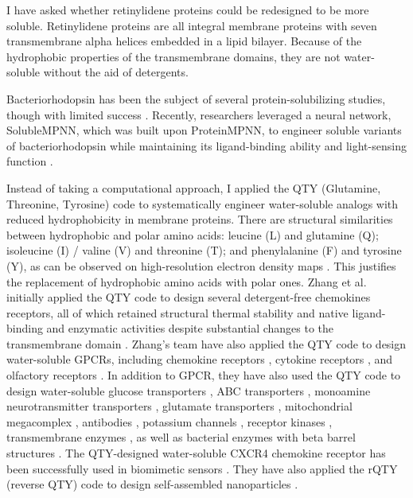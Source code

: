 \documentclass[fleqn, 10pt]{manuscript}
\begin{document}
I have asked whether retinylidene proteins could be redesigned to be more soluble. Retinylidene proteins are all integral membrane proteins with seven transmembrane alpha helices embedded in a lipid bilayer. Because of the hydrophobic properties of the transmembrane domains, they are not water-soluble without the aid of detergents. 

Bacteriorhodopsin has been the subject of several protein-solubilizing studies, though with limited success \citep{Qing_2022}. Recently, researchers leveraged a neural network, SolubleMPNN, which was built upon ProteinMPNN, to engineer soluble variants of bacteriorhodopsin while maintaining its ligand-binding ability and light-sensing function \citep{Nikolaev_2024}.

Instead of taking a computational approach, I applied the QTY (Glutamine, Threonine, Tyrosine) code to systematically engineer water-soluble analogs with reduced hydrophobicity in membrane proteins. There are structural similarities between hydrophobic and polar amino acids: leucine (L) and glutamine (Q); isoleucine (I) / valine (V) and threonine (T); and phenylalanine (F) and tyrosine (Y), as can be observed on high-resolution electron density maps \citep{Zhang_2018, Zhang_2022, Tegler_2020}. This justifies the replacement of hydrophobic amino acids with polar ones. Zhang et al. initially applied the QTY code to design several detergent-free chemokines receptors, all of which retained structural thermal stability and native ligand-binding and enzymatic activities despite substantial changes to the transmembrane domain \citep{Zhang_2018, Tegler_2020}. Zhang's team have also applied the QTY code to design water-soluble GPCRs, including chemokine receptors \citep{Zhang_2018, Qing_2019, Tegler_2020, Skuhersky_2021}, cytokine receptors \citep{Hao_2020}, and olfactory receptors \citep{Skuhersky_2021, Johnsson_2025}. In addition to GPCR, they have also used the QTY code to design water-soluble glucose transporters \citep{Smorodina_2022}, ABC transporters \citep{Pan_2024}, monoamine neurotransmitter transporters \citep{Karagol_Karagol_Alper_2024}, glutamate transporters \citep{Karagol_Karagol_Smorodina_2024, Karagol_2024}, mitochondrial megacomplex \citep{Chen_2025}, antibodies \citep{Li_Wang_2024}, potassium channels \citep{Smorodina_2024}, receptor kinases \citep{Li_Tang_2024}, transmembrane enzymes \citep{Chen_Pan_2025}, as well as bacterial enzymes with beta barrel structures \citep{Sajeev-Sheeja_2023, Sajeev-Sheeja_2024}. The QTY-designed water-soluble CXCR4 chemokine receptor has been successfully used in biomimetic sensors \citep{Qing_2023}. They have also applied the rQTY (reverse QTY) code to design self-assembled nanoparticles \citep{Meng_2023}.
\end{document}
